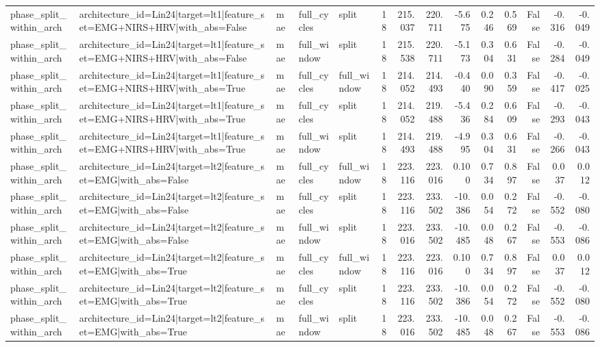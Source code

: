 \begin{table}
\begin{tabular}{lllllrrrrrrrrr}
phase_split_within_arch & architecture_id=Lin24|target=lt1|feature_set=EMG+NIRS+HRV|with_abs=False & mae & full_cycles & split & 18 & 215.037 & 220.711 & -5.675 & 0.246 & 0.569 & False & -0.316 & -0.049 \\
phase_split_within_arch & architecture_id=Lin24|target=lt1|feature_set=EMG+NIRS+HRV|with_abs=False & mae & full_window & split & 18 & 215.538 & 220.711 & -5.173 & 0.304 & 0.631 & False & -0.284 & -0.049 \\
phase_split_within_arch & architecture_id=Lin24|target=lt1|feature_set=EMG+NIRS+HRV|with_abs=True & mae & full_cycles & full_window & 18 & 214.052 & 214.493 & -0.440 & 0.090 & 0.359 & False & -0.417 & -0.025 \\
phase_split_within_arch & architecture_id=Lin24|target=lt1|feature_set=EMG+NIRS+HRV|with_abs=True & mae & full_cycles & split & 18 & 214.052 & 219.488 & -5.436 & 0.284 & 0.609 & False & -0.293 & -0.043 \\
phase_split_within_arch & architecture_id=Lin24|target=lt1|feature_set=EMG+NIRS+HRV|with_abs=True & mae & full_window & split & 18 & 214.493 & 219.488 & -4.995 & 0.304 & 0.631 & False & -0.266 & -0.043 \\
phase_split_within_arch & architecture_id=Lin24|target=lt2|feature_set=EMG|with_abs=False & mae & full_cycles & full_window & 18 & 223.116 & 223.016 & 0.100 & 0.734 & 0.897 & False & 0.037 & 0.012 \\
phase_split_within_arch & architecture_id=Lin24|target=lt2|feature_set=EMG|with_abs=False & mae & full_cycles & split & 18 & 223.116 & 233.502 & -10.386 & 0.054 & 0.272 & False & -0.552 & -0.080 \\
phase_split_within_arch & architecture_id=Lin24|target=lt2|feature_set=EMG|with_abs=False & mae & full_window & split & 18 & 223.016 & 233.502 & -10.485 & 0.048 & 0.267 & False & -0.553 & -0.086 \\
phase_split_within_arch & architecture_id=Lin24|target=lt2|feature_set=EMG|with_abs=True & mae & full_cycles & full_window & 18 & 223.116 & 223.016 & 0.100 & 0.734 & 0.897 & False & 0.037 & 0.012 \\
phase_split_within_arch & architecture_id=Lin24|target=lt2|feature_set=EMG|with_abs=True & mae & full_cycles & split & 18 & 223.116 & 233.502 & -10.386 & 0.054 & 0.272 & False & -0.552 & -0.080 \\
phase_split_within_arch & architecture_id=Lin24|target=lt2|feature_set=EMG|with_abs=True & mae & full_window & split & 18 & 223.016 & 233.502 & -10.485 & 0.048 & 0.267 & False & -0.553 & -0.086 \\

\end{tabular}
\end{table}
